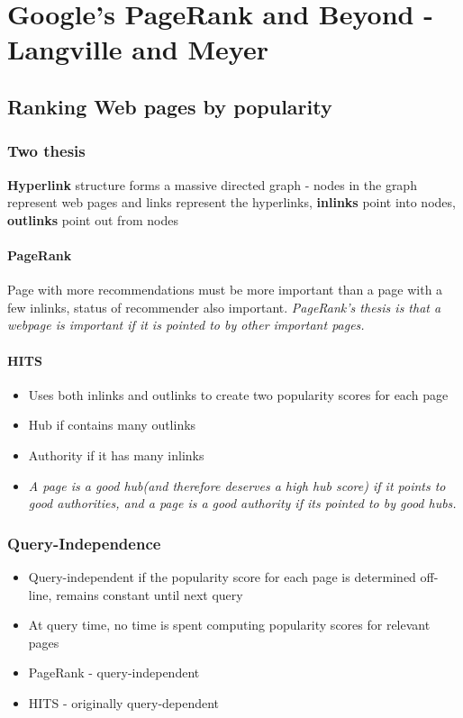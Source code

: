 \documentclass[11pt]{report}
\begin{document}
\part{Google's PageRank and Beyond - Langville and Meyer}
\chapter{Ranking Web pages by popularity}
\section{Two thesis}
\textbf{Hyperlink} structure forms a massive directed graph - nodes in the graph represent web pages and links represent the hyperlinks, \textbf{inlinks} point into nodes, \textbf{outlinks} point out from nodes
\subsection{PageRank}
Page with more recommendations must be more important than a page with a few inlinks, status of recommender also important. \textit{PageRank's thesis is that a webpage is important if it is pointed to by other important pages.}
\subsection{HITS}
\begin{itemize}
\item Uses both inlinks and outlinks to create two popularity scores for each page
\item Hub if contains many outlinks
\item Authority if it has many inlinks
\item \textit{A page is a good hub(and therefore deserves a high hub score) if it points to good authorities, and a page is a good authority if its pointed to by good hubs.}
\end{itemize}
\section{Query-Independence}
\begin{itemize}
\item Query-independent if the popularity score for each page is determined off-line, remains constant until next query
\item At query time, no time is spent computing popularity scores for relevant pages
\item PageRank - query-independent
\item HITS - originally query-dependent
\end{itemize}
\end{document}
